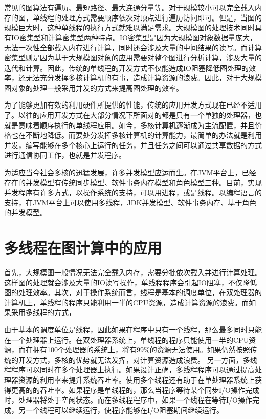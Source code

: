 常见的图算法有遍历、最短路径、最大连通分量等。对于规模较小可以完全载入内存的图，单线程的处理方式需要顺序依次对顶点进行遍历访问即可。但是，当图的规模巨大时，这种单线程的执行方式就难以满足需求。大规模图的处理技术同时具有IO密集型和计算密集型两种特点。IO密集型是因为大规模图对象数据量庞大，无法一次性全部载入内存进行计算，同时还会涉及大量的中间结果的读写。而计算密集型则是因为基于大规模图对象的应用需要对整个图进行分析计算，涉及大量的迭代和计算。因此，传统的单线程的开发方式不仅能造成IO阻塞降低图处理的效率，还无法充分发挥多核计算机的有事，造成计算资源的浪费。因此，对于大规模图对象的处理一般采用并发的方式来提高图处理的效率。

为了能够更加有效的利用硬件所提供的性能，传统的应用开发方式现在已经不适用了。以往的应用开发方式在大部分情况下所面对的都是只有一个单独的处理器，也就是意味着顺序执行的单线程应用。如今，多核计算机逐渐成为主流配置，并且价格也在不断地降低。而要处分发挥多核计算机的计算能力，最简单的办法就是利用并发，编写能够在多个核心上运行的任务，并且任务之间可以通过共享数据的方式进行通信协同工作，也就是并发程序。

为适应当今社会多核的迅猛发展，许多并发模型应运而生。在JVM平台上，已经存在的并发模型有传统同步模型、软件事务内存模型和角色模型三种。目前，实现并发程序有许多方式，以操作系统的支持，可以用进程，或是线程。以编程语言的支持，在JVM平台上可以使用多线程，JDK并发模型、软件事务内存、基于角色的并发模型。


\section{多线程在图计算中的应用}



首先，大规模图一般情况无法完全载入内存，需要分批依次载入并进行计算处理。这样图的处理就会涉及大量的IO读写操作，单线程程序会引起IO阻塞，不仅降低图的处理效率。其次，对于操作系统而言，线程是基本的调度单位，在双处理器的计算机上，单线程的程序只能利用一半的CPU资源，造成计算资源的浪费。而如果采用多线程的方式，




由于基本的调度单位是线程，因此如果在程序中只有一个线程，那么最多同时只能在一个处理器上运行。在双处理器系统上，单线程的程序只能使用一半的CPU资源，而在拥有100个处理器的系统上，将有99$\%$的资源无法使用。如果仍然按照传统的开发方式，多核的优势就无法发挥，对计算资源造成浪费。
另一方面，多线程程序可以同时在多个处理器上执行。如果设计正确，多线程程序可以通过提高处理器资源的利用率来提升系统吞吐率。使用多个线程还有助于在单处理器系统上获得更高的的吞吐率。如果程序是单线程的，那么当程序等待某个同步I/O操作完成时，处理器将处于空闲状态。而在多线程程序中，如果一个线程在等待I/O操作完成，另一个线程可以继续运行，使程序能够在I/O阻塞期间继续运行。




